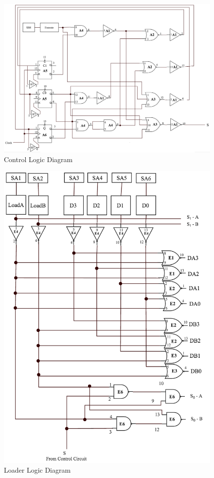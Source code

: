 \documentclass[journal, twocolumn, final,11pt,letterpaper]{IEEEtran}
\begin{document}
\begin{figure} [H]
	\centering
	\includegraphics[scale=0.55]{Control_Logic.png}
	\caption{Control Logic Diagram\label{fig:control-logic-diagram}}
\end{figure}

\begin{figure} [H]
	\centering
	\includegraphics[scale=0.65]{Loader_Logic.png}
	\caption{Loader Logic Diagram\label{fig:loader-logic-diagram}}
\end{figure}
\end{document}
